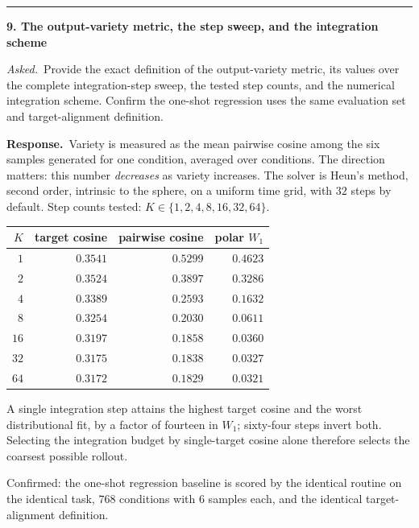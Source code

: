 \documentclass[11pt]{article}
\newenvironment{item12}[1]{%
  \par\medskip\noindent\rule{\textwidth}{0.7pt}\par\nobreak\smallskip
  \noindent\textbf{\large #1}\par\nobreak\smallskip
}{\par\medskip}
\newcommand{\ask}[1]{\noindent\emph{Asked.}\ #1\par\smallskip}
\newcommand{\resp}{\noindent\textbf{Response.}\ }
\begin{document}
\begin{item12}{9. The output-variety metric, the step sweep, and the integration scheme}
\ask{Provide the exact definition of the output-variety metric, its values over the complete
integration-step sweep, the tested step counts, and the numerical integration scheme. Confirm the
one-shot regression uses the same evaluation set and target-alignment definition.}

\resp Variety is measured as the mean pairwise cosine among the six samples generated for one
condition, averaged over conditions. The direction matters: this number \emph{decreases} as
variety increases. The solver is Heun's method, second order, intrinsic to the sphere, on a
uniform time grid, with $32$ steps by default. Step counts tested: $K\in\{1,2,4,8,16,32,64\}$.

\begin{center}
\small
\begin{tabular}{@{}rrrr@{}}
\toprule
$K$ & target cosine & pairwise cosine & polar $W_1$\\
\midrule
$1$  & $0.3541$ & $0.5299$ & $0.4623$\\
$2$  & $0.3524$ & $0.3897$ & $0.3286$\\
$4$  & $0.3389$ & $0.2593$ & $0.1632$\\
$8$  & $0.3254$ & $0.2030$ & $0.0611$\\
$16$ & $0.3197$ & $0.1858$ & $0.0360$\\
$32$ & $0.3175$ & $0.1838$ & $0.0327$\\
$64$ & $0.3172$ & $0.1829$ & $0.0321$\\
\bottomrule
\end{tabular}
\end{center}

A single integration step attains the highest target cosine and the worst distributional fit, by
a factor of fourteen in $W_1$; sixty-four steps invert both. Selecting the integration budget by
single-target cosine alone therefore selects the coarsest possible rollout.

Confirmed: the one-shot regression baseline is scored by the identical routine on the identical
task, $768$ conditions with $6$ samples each, and the identical target-alignment definition.
\end{item12}
\end{document}
